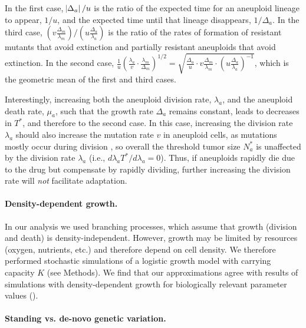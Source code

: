 \documentclass[12pt]{extarticle}
\begin{document}
In the first case, $\abs{\Delta_a}/u$ is  the ratio of the expected time for an aneuploid lineage to appear, $1/u$, and the expected time until that lineage disappears, $1/\Delta_a$.
In the third case, $\left(v \frac{\Delta_m}{\lambda_m}\right) / \left(u \frac{\Delta_a}{\lambda_a}\right)$ is the ratio of the rates of formation of resistant mutants that avoid extinction and partially resistant aneuploids that avoid extinction.
In the second case, $\frac{1}{u}\left(\frac{\lambda_a}{v} \cdot \frac{\lambda_m}{\Delta_m}\right)^{1/2}=\sqrt{\frac{\Delta_a}{u} \cdot v \frac{\Delta_m}{\lambda_m} \cdot \left(u\frac{\Delta_a}{\lambda_a}\right)^{-1}}$, which is the geometric mean of the first and third cases.

Interestingly, increasing both the aneuploid division rate, $\lambda_a$, and the aneuploid death rate, $\mu_a$, such that the growth rate $\Delta_a$ remains constant, leads to decreases in $T^*$, and therefore to the second case. In this case, increasing the division rate $\lambda_a$ should also increase the mutation rate $v$ in aneuploid cells, as mutations mostly occur during division , so overall the threshold tumor size $N_a^*$ is unaffected by the division rate $\lambda_a$ (i.e., $d \lambda_a T^*/d\lambda_a = 0$). Thus, if aneuploids rapidly die due to the drug but compensate by rapidly dividing, further increasing  the division rate will \emph{not} facilitate adaptation.

\paragraph*{Density-dependent growth.}

In our analysis we used branching processes, which assume that growth (division and death) is density-independent. However, growth may be limited by resources (oxygen, nutrients, etc.) and therefore depend on cell density. 
We therefore performed stochastic simulations of a logistic growth model with carrying capacity $K$ (see Methods). 
We find that our approximations agree with results of simulations with density-dependent growth for biologically relevant parameter values ().

\paragraph*{Standing vs. de-novo genetic variation.}
\end{document}
